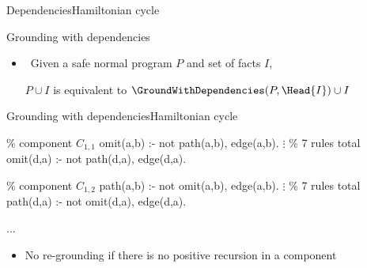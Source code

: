 \begin{frame}[shrink]{Dependencies}{Hamiltonian cycle}
  \begin{center}
    \DepGraph
  \end{center}
\end{frame}
\begin{frame}{Grounding with dependencies}
  \bigskip
  \begin{center}
  \end{center}
  \bigskip
  \begin{itemize}
  \item<2->  \ Given a safe normal program \(P\) and set of facts \(I\),

    \(P \cup I\) is equivalent to \(\GroundWithDependencies(P,\Head{I}) \cup I\)
  \end{itemize}
\end{frame}
\begin{frame}{Grounding with dependencies}{Hamiltonian cycle}
\newcommand{\Component}[1]{\(C_{#1}\)}
\begin{SemiVerbatim}{.9}
{\color{comment}\% component \Component{1,1}}
omit(a,b) :- not path(a,b), \alert{edge(a,b)}.
          \(\vdots\) {\color{comment}\% 7 rules total}
omit(d,a) :- not path(d,a), \alert{edge(d,a)}.

{\color{comment}\% component \Component{1,2}}
path(a,b) :- not omit(a,b), \alert{edge(a,b)}.
          \(\vdots\) {\color{comment}\% 7 rules total}
path(d,a) :- not omit(d,a), \alert{edge(d,a)}.

...
\end{SemiVerbatim}
\vspace{-.8cm}
\begin{itemize}
\item<2-> No re-grounding if there is no positive recursion in a component
\end{itemize}
\smallskip
\end{frame}
